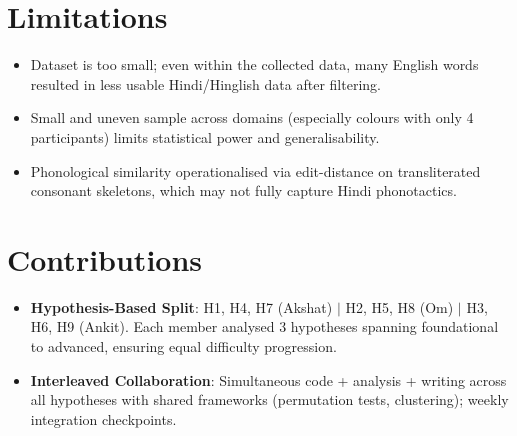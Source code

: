 \documentclass[12pt]{article}
\begin{document}
\section*{Limitations}

\begin{itemize}
\item Dataset is too small; even within the collected data, many English words resulted in less usable Hindi/Hinglish data after filtering.
\item Small and uneven sample across domains (especially colours with only 4 participants) limits statistical power and generalisability.
\item Phonological similarity operationalised via edit-distance on transliterated consonant skeletons, which may not fully capture Hindi phonotactics.
\end{itemize}

\section*{Contributions}

\begin{itemize}
\item \textbf{Hypothesis-Based Split}: H1, H4, H7 (Akshat) $|$ H2, H5, H8 (Om) $|$ H3, H6, H9 (Ankit). Each member analysed 3 hypotheses spanning foundational to advanced, ensuring equal difficulty progression.
\item \textbf{Interleaved Collaboration}: Simultaneous code + analysis + writing across all hypotheses with shared frameworks (permutation tests, clustering); weekly integration checkpoints.
\end{itemize}


\end{document}
